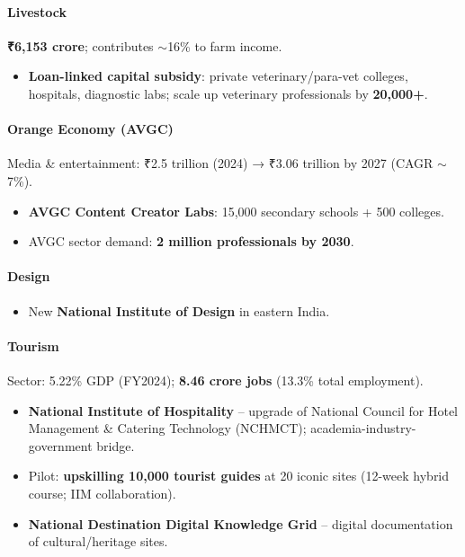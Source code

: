 \paragraph{Livestock} \textbf{₹6,153 crore}; contributes $\sim$16\% to farm income.
\begin{itemize}
  \item \textbf{Loan-linked capital subsidy}: private veterinary/para-vet colleges, hospitals, diagnostic labs; scale up veterinary professionals by \textbf{20,000+}.
\end{itemize}

\paragraph{Orange Economy (AVGC)} Media \& entertainment: ₹2.5 trillion (2024) → ₹3.06 trillion by 2027 (CAGR $\sim$7\%).
\begin{itemize}
  \item \textbf{AVGC Content Creator Labs}: 15,000 secondary schools + 500 colleges.
  \item AVGC sector demand: \textbf{2 million professionals by 2030}.
\end{itemize}

\paragraph{Design}
\begin{itemize}
  \item New \textbf{National Institute of Design} in eastern India.
\end{itemize}

\paragraph{Tourism} Sector: 5.22\% GDP (FY2024); \textbf{8.46 crore jobs} (13.3\% total employment).
\begin{itemize}
  \item \textbf{National Institute of Hospitality} -- upgrade of National Council for Hotel Management \& Catering Technology (NCHMCT); academia-industry-government bridge.
  \item Pilot: \textbf{upskilling 10,000 tourist guides} at 20 iconic sites (12-week hybrid course; IIM collaboration).
  \item \textbf{National Destination Digital Knowledge Grid} -- digital documentation of cultural/heritage sites.
\end{itemize}

